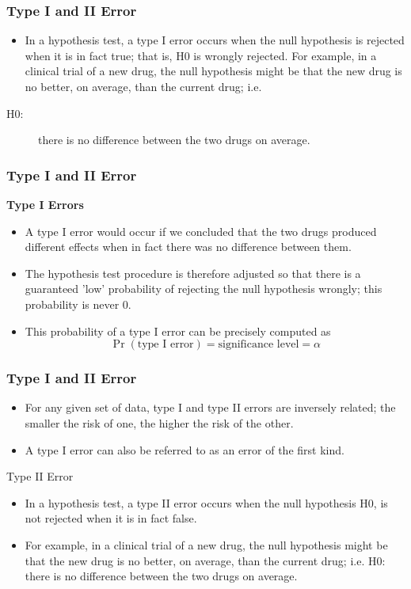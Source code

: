 \documentclass{beamer}
\begin{document}
	\begin{frame}
		\frametitle{Type I and II Error}
		\large
		\begin{itemize}
			\item In a hypothesis test, a type I error occurs when the null hypothesis
			is rejected when it is in fact true; that is, H0 is wrongly rejected.
			For example, in a clinical trial of a new drug, the null hypothesis
			might be that the new drug is no better, on average, than the
			current drug; i.e.
		\end{itemize}
			\begin{description}
				\item[H0: ] there is no difference between the two drugs on average.
			\end{description}
\end{frame}
\begin{frame}
			\frametitle{Type I and II Error}
			\large
			\noindent \textbf{Type I Errors}
			\begin{itemize}
				\item A type I error would occur if we concluded that the two drugs
				produced different effects when in fact there was no difference
				between them.
				
				
				\item The hypothesis test procedure is therefore adjusted so that there is
				a guaranteed 'low' probability of rejecting the null hypothesis
				wrongly; this probability is never 0.
				
				\item This probability of a type I error can be precisely computed as
				\[\Pr(\mbox{type I error}) = \mbox{significance level} = \alpha\]
				
			\end{itemize}
\end{frame}
\begin{frame}
\frametitle{Type I and II Error}
\large
\begin{itemize}
				\item For any given set of data, type I and type II errors are inversely
				related; the smaller the risk of one, the higher the risk of the other.
				\item A type I error can also be referred to as an error of the first kind.
			\end{itemize}
			Type II Error
			\begin{itemize}
				\item In a hypothesis test, a type II error occurs when the null hypothesis
				H0, is not rejected when it is in fact false. 
				\item For example, in a clinical
				trial of a new drug, the null hypothesis might be that the new drug
				is no better, on average, than the current drug; i.e.
				H0: there is no difference between the two drugs on average.
			\end{itemize}
			
\end{frame}
\end{document}
